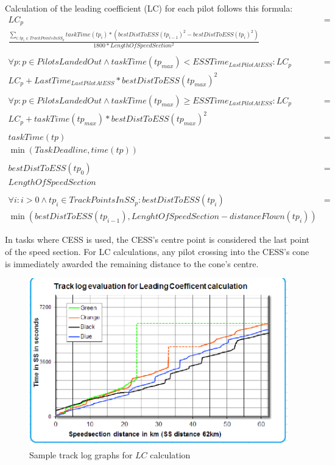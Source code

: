 \documentclass{article}
\begin{document}
Calculation of the leading coefficient (LC) for each pilot follows this
formula:
\begin{align*}
    LC_p &= \\
    \frac{\sum_{i : tp_i \in TrackPointsInSS_p} taskTime(tp_i) * (bestDistToESS(tp_{i - 1})^2 - bestDistToESS(tp_i)^2)}{1800 * LengthOfSpeedSection^2} \\
    \\
    \forall p : p \in PilotsLandedOut \land taskTime(tp_{max}) < ESSTime_{LastPilotAtESS} : LC_p &= \\
    LC_p + LastTime_{LastPilotAtESS} * bestDistToESS(tp_{max})^2 \\
    \\
    \forall p : p \in PilotsLandedOut \land taskTime(tp_{max}) \geq ESSTime_{LastPilotAtESS} : LC_p &= \\
    LC_p + taskTime(tp_{max}) * bestDistToESS(tp_{max})^2 \\
    \\
    taskTime(tp) &= \\
    \min(TaskDeadline, time(tp)) \\
    \\
    bestDistToESS(tp_0) &= \\
    LengthOfSpeedSection \\
    \\
    \forall i : i > 0 \land tp_i \in TrackPointsInSS_p : bestDistToESS(tp_i) &= \\
    \min(bestDistToESS(tp_{i - 1}), LenghtOfSpeedSection - distanceFlown(tp_i))
\end{align*}
\begin{pg}
In tasks where CESS is used, the CESS’s centre point is considered the last
point of the speed section. For LC calculations, any pilot crossing into the
CESS’s cone is immediately awarded the remaining distance to the cone’s centre.
\end{pg}

\begin{figure}[h]
    \centering
    \includegraphics[scale=0.8]{img/leading-area.png}
    \caption{Sample track log graphs for \(LC\) calculation}
\end{figure}
\end{document}
